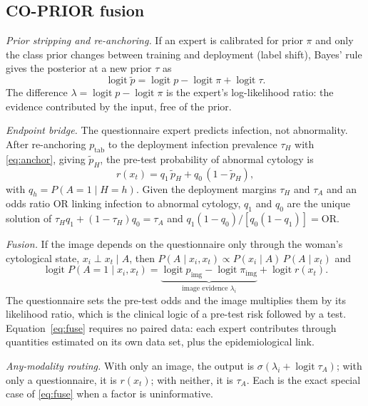 \documentclass[lettersize,journal]{IEEEtran}
\newcommand{\logit}{\operatorname{logit}}
\newcommand{\pimg}{p_{\mathrm{img}}}
\newcommand{\ptab}{p_{\mathrm{tab}}}
\newcommand{\piimg}{\pi_{\mathrm{img}}}
\begin{document}
\subsection{CO-PRIOR fusion}
\label{sec:coprior}
\emph{Prior stripping and re-anchoring.} If an expert is calibrated for prior $\pi$ and only the class prior changes between training and deployment (label shift), Bayes' rule gives the posterior at a new prior $\tau$ as \cite{saerens2002adjusting}
\begin{equation}
\logit \tilde p = \logit p - \logit \pi + \logit \tau .
\label{eq:anchor}
\end{equation}
The difference $\lambda = \logit p - \logit\pi$ is the expert's log-likelihood ratio: the evidence contributed by the input, free of the prior.

\emph{Endpoint bridge.} The questionnaire expert predicts infection, not abnormality. After re-anchoring $\ptab$ to the deployment infection prevalence $\tau_H$ with \eqref{eq:anchor}, giving $\tilde p_H$, the pre-test probability of abnormal cytology is
\begin{equation}
r(x_t) = q_1\,\tilde p_H + q_0\,(1-\tilde p_H),
\label{eq:bridge}
\end{equation}
with $q_h = P(A{=}1\mid H{=}h)$. Given the deployment margins $\tau_H$ and $\tau_A$ and an odds ratio $\mathrm{OR}$ linking infection to abnormal cytology, $q_1$ and $q_0$ are the unique solution of $\tau_H q_1 + (1-\tau_H) q_0 = \tau_A$ and $q_1(1-q_0)/[q_0(1-q_1)] = \mathrm{OR}$.

\emph{Fusion.} If the image depends on the questionnaire only through the woman's cytological state, $x_i \perp x_t \mid A$, then $P(A\mid x_i,x_t)\propto P(x_i\mid A)\,P(A\mid x_t)$ and
\begin{equation}
\logit P(A{=}1\mid x_i,x_t) = \underbrace{\logit\pimg - \logit\piimg}_{\text{image evidence } \lambda_i} + \logit r(x_t).
\label{eq:fuse}
\end{equation}
The questionnaire sets the pre-test odds and the image multiplies them by its likelihood ratio, which is the clinical logic of a pre-test risk followed by a test. Equation~\eqref{eq:fuse} requires no paired data: each expert contributes through quantities estimated on its own data set, plus the epidemiological link.

\emph{Any-modality routing.} With only an image, the output is $\sigma(\lambda_i + \logit\tau_A)$; with only a questionnaire, it is $r(x_t)$; with neither, it is $\tau_A$. Each is the exact special case of \eqref{eq:fuse} when a factor is uninformative.
\end{document}
